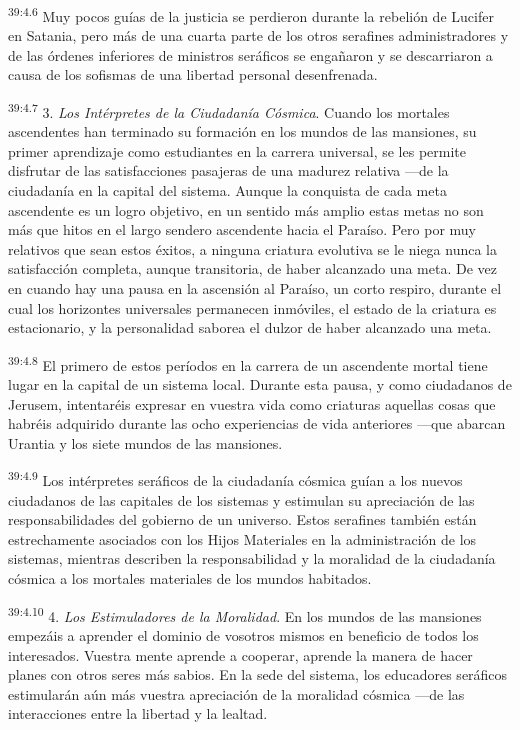 \par
\textsuperscript{39:4.6} Muy pocos guías de la justicia se perdieron durante la rebelión de Lucifer en Satania, pero más de una cuarta parte de los otros serafines administradores y de las órdenes inferiores de ministros seráficos se engañaron y se descarriaron a causa de los sofismas de una libertad personal desenfrenada.

\par
\textsuperscript{39:4.7} 3. \textit{Los Intérpretes de la Ciudadanía Cósmica}. Cuando los mortales ascendentes han terminado su formación en los mundos de las mansiones, su primer aprendizaje como estudiantes en la carrera universal, se les permite disfrutar de las satisfacciones pasajeras de una madurez relativa ---de la ciudadanía en la capital del sistema. Aunque la conquista de cada meta ascendente es un logro objetivo, en un sentido más amplio estas metas no son más que hitos en el largo sendero ascendente hacia el Paraíso. Pero por muy relativos que sean estos éxitos, a ninguna criatura evolutiva se le niega nunca la satisfacción completa, aunque transitoria, de haber alcanzado una meta. De vez en cuando hay una pausa en la ascensión al Paraíso, un corto respiro, durante el cual los horizontes universales permanecen inmóviles, el estado de la criatura es estacionario, y la personalidad saborea el dulzor de haber alcanzado una meta.

\par
\textsuperscript{39:4.8} El primero de estos períodos en la carrera de un ascendente mortal tiene lugar en la capital de un sistema local. Durante esta pausa, y como ciudadanos de Jerusem, intentaréis expresar en vuestra vida como criaturas aquellas cosas que habréis adquirido durante las ocho experiencias de vida anteriores ---que abarcan Urantia y los siete mundos de las mansiones.

\par
\textsuperscript{39:4.9} Los intérpretes seráficos de la ciudadanía cósmica guían a los nuevos ciudadanos de las capitales de los sistemas y estimulan su apreciación de las responsabilidades del gobierno de un universo. Estos serafines también están estrechamente asociados con los Hijos Materiales en la administración de los sistemas, mientras describen la responsabilidad y la moralidad de la ciudadanía cósmica a los mortales materiales de los mundos habitados.

\par
\textsuperscript{39:4.10} 4. \textit{Los Estimuladores de la Moralidad}. En los mundos de las mansiones empezáis a aprender el dominio de vosotros mismos en beneficio de todos los interesados. Vuestra mente aprende a cooperar, aprende la manera de hacer planes con otros seres más sabios. En la sede del sistema, los educadores seráficos estimularán aún más vuestra apreciación de la moralidad cósmica ---de las interacciones entre la libertad y la lealtad.

